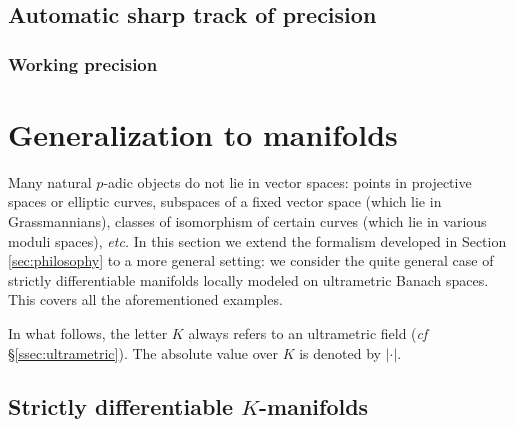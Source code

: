 \documentclass{amsart}
\begin{document}
\subsection{Automatic sharp track of precision}


\subsubsection*{Working precision}

\section{Generalization to manifolds}

Many natural $p$-adic objects do not lie in vector spaces:
points in projective spaces or elliptic curves,
subspaces of a fixed vector space (which lie in Grassmannians),
classes of isomorphism of certain curves (which lie in various moduli spaces),
\emph{etc.}  In this section we extend the formalism 
developed in Section \ref{sec:philosophy} to a more general setting:
we consider the quite general case of strictly
differentiable manifolds locally modeled on ultrametric Banach spaces.
This covers all the 
aforementioned examples.

In what follows, the letter $K$ always refers to an ultrametric field 
(\emph{cf} \S \ref{ssec:ultrametric}). The absolute value over $K$ is 
denoted by $|\cdot|$.

\subsection{Strictly differentiable $K$-manifolds}
\label{ssec:manifold}
\end{document}
